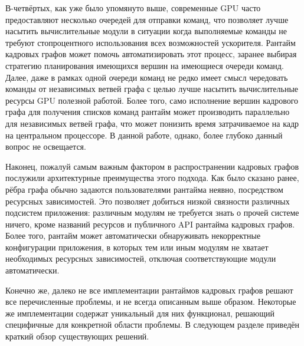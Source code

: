 В-четвёртых, как уже было упомянуто выше, современные GPU часто предоставляют несколько очередей для отправки команд, что позволяет лучше насытить вычислительные модули в ситуации когда выполняемые команды не требуют стопроцентного использования всех возможностей ускорителя. Рантайм кадровых графов может помочь автоматизировать этот процесс, заранее выбирая стратегию планирования имеющихся вершин на имеющиеся очереди команд. Далее, даже в рамках одной очереди команд не редко имеет смысл чередовать команды от независимых ветвей графа с целью лучше насытить вычислительные ресурсы GPU полезной работой. Более того, само исполнение вершин кадрового графа для получения списков команд рантайм может производить параллельно для независимых ветвей графа, что может понизить время затрачиваемое на кадр на центральном процессоре. В данной работе, однако, более глубоко данный вопрос не освещается.

Наконец, пожалуй самым важным фактором в распространении кадровых графов послужили архитектурные преимущества этого подхода. Как было сказано ранее, рёбра графа обычно задаются пользователями рантайма неявно, посредством ресурсных зависимостей. Это позволяет добиться низкой связности различных подсистем приложения: различным модулям не требуется знать о прочей системе ничего, кроме названий ресурсов и публичного API рантайма кадровых графов. Более того, рантайм может автоматически обнаруживать некорректные конфигурации приложения, в которых тем или иным модулям не хватает необходимых ресурсных зависимостей, отключая соответствующие модули автоматически.

Конечно же, далеко не все имплементации рантаймов кадровых графов решают все перечисленные проблемы, и не всегда описанным выше образом. Некоторые же имплементации содержат уникальный для них функционал, решающий специфичные для конкретной области проблемы. В следующем разделе приведён краткий обзор существующих решений.
